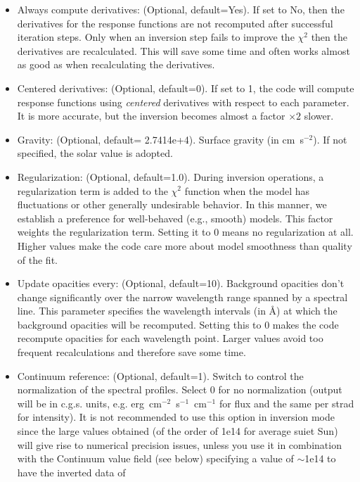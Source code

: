 \begin{itemize}
\item Always compute derivatives: (Optional, default=Yes). If set to
  No, then the derivatives for the response functions are not
  recomputed after successful iteration steps. Only when an inversion
  step fails to improve the $\chi^2$ then the derivatives are
  recalculated. This will save some time and often works almost as
  good as when recalculating the derivatives.
\item Centered derivatives: (Optional, default=0). If set to 1, the
  code will compute response functions using \emph{centered}
  derivatives with respect to each parameter. It is more accurate, but
  the inversion becomes almost a factor $\times2$ slower. 
\item Gravity: (Optional, default= 2.7414e+4). Surface gravity (in
  cm~s$^{-2}$). If not specified, the solar value is adopted.
\item Regularization: (Optional, default=1.0). During inversion
  operations, a regularization term is added to the $\chi^2$ function
  when the model has fluctuations or other generally undesirable
  behavior. In this manner, we establish a preference for well-behaved
  (e.g., smooth) models. This factor weights the regularization
  term. Setting it to 0 means no regularization at all. Higher values
  make the code care more about model smoothness than quality of the
  fit.
\item Update opacities every: (Optional, default=10). Background
  opacities don't change significantly over the narrow wavelength
  range spanned by a spectral line. This parameter specifies the
  wavelength intervals (in \AA ) at which the background opacities
  will be recomputed. Setting this to 0 makes the code recompute
  opacities for each wavelength point. Larger values avoid too
  frequent recalculations and therefore save some time.
\item Continuum reference: (Optional, default=1). Switch to control
  the normalization of the spectral profiles.  Select 0 for no
  normalization (output will be in c.g.s. units,
  e.g. erg~cm$^{-2}$~s$^{-1}$~cm$^{-1}$ for flux and the same per
  strad for intensity). It is not recommended to use this option in
  inversion mode since the large values obtained (of the order of 1e14
  for average suiet Sun) will give rise to numerical precision issues,
  unless you use it in combination with the Continuum value field (see
  below) specifying a value of $\sim$1e14 to have the inverted data of

\end{itemize}
